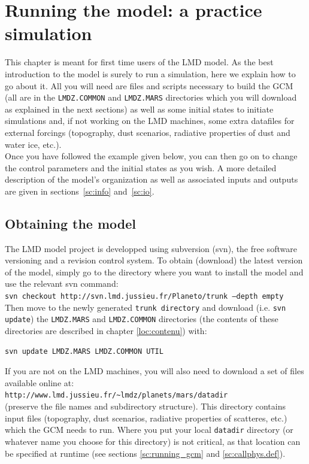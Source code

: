 

\chapter{Running the model: a practice simulation}

\label{loc:contact1}

This chapter is meant for first time users of the LMD model.
As the best introduction to the model is surely to run a simulation,
here we explain how to go about it.
All you will need are files and scripts necessary to build the GCM (all are in
the {\tt LMDZ.COMMON} and {\tt LMDZ.MARS} directories which you will download
as explained in the next
sections) as well as some initial states to initiate simulations and,
if not working on the
LMD machines, some extra datafiles for external forcings (topography,
dust scenarios, radiative properties of dust and water ice, etc.).\\
Once you have followed the example given below,
you can then go on to change the control parameters and the initial states
as you wish. A more detailed description of the model's organization
as well as associated inputs and
outputs are given in sections~\ref{sc:info} and~\ref{sc:io}.

\section{Obtaining the model}
The LMD model project is developped using subversion (svn), the free software
versioning and a revision control system.
To obtain (download) the latest version of the model,
simply go to the directory where you want to
install the model and use the relevant svn command:\\
{\tt svn checkout http://svn.lmd.jussieu.fr/Planeto/trunk --depth empty}\\
Then move to the newly generated {\tt trunk directory} and download
(i.e. {\tt svn update}) the
{\tt LMDZ.MARS} and {\tt LMDZ.COMMON} directories (the contents of these
directories are described in chapter \ref{loc:contenu}) with:
\begin{verbatim}
svn update LMDZ.MARS LMDZ.COMMON UTIL
\end{verbatim}

If you are not on the LMD machines, you will also need to download a
set of files available online at:\\
{\verb+http://www.lmd.jussieu.fr/~lmdz/planets/mars/datadir+}\\
(preserve the file names and subdirectory structure).
This directory contains input files (topography, dust scenarios,
radiative properties of scatteres, etc.) which the GCM needs to run.
Where you put your local {\tt datadir} directory (or whatever name
you choose for this directory) is not critical, as that location can
be specified at runtime (see sections \ref{sc:running_gcm} and
\ref{sc:callphys.def}).\\

